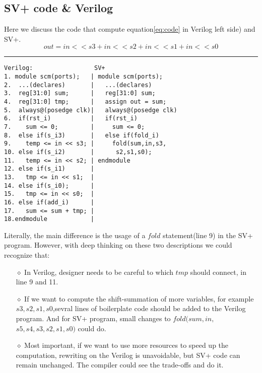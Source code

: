\documentclass{acm_proc_article-sp}
\begin{document}
\subsection{SV+ code \& Verilog}
Here we discuss the code that compute equation\eqref{eq:code} in Verilog left side) and SV+.
\begin{equation}
out = in{<<}s3{+}in{<<}s2{+}in{<<}s1{+}in{<<}s0 
\label{eq:code}
\end{equation}
\hrule
\vspace{-3ex}
\begin{verbatim}
Verilog:                 SV+
1. module scm(ports);   | module scm(ports);
2.  ...(declares)       |   ...(declares)
3.  reg[31:0] sum;      |   reg[31:0] sum;
4.  reg[31:0] tmp;      |   assign out = sum;
5.  always@(posedge clk)|   always@(posedge clk)
6.  if(rst_i)           |   if(rst_i)
7.    sum <= 0;         |     sum <= 0;
8.  else if(s_i3)       |   else if(fold_i)
9.    temp <= in << s3; |     fold(sum,in,s3,
10. else if(s_i2)       |      s2,s1,s0);
11.   temp <= in << s2; | endmodule
12. else if(s_i1)       | 
13.   tmp <= in << s1;  | 
14. else if(s_i0);      | 
15.   tmp <= in << s0;  |
16. else if(add_i)      |
17.   sum <= sum + tmp; |
18.endmodule            | 
\end{verbatim}
\vspace{-3ex}
Literally, the main difference  is the usage of a $fold$ statement(line 9) in the SV+ 
program. However, with deep thinking on these two descriptions we could recognize that:
\vspace{-3ex}
\begin{itemize}\itemsep2pt \parskip0pt 
\item[$\diamond$] In Verilog, designer needs to be careful to which $tmp$ should connect, in line 9 and 11.
\item[$\diamond$] If we want to compute the shift-summation of more variables, for example $s3,s2,s1,s0$,sevral 
lines of boilerplate code should be added to the Verilog program. And for SV+ program, small 
changes to $fold(sum,in,$ $s5,s4,s3,s2,s1,s0)$ could do.
\item[$\diamond$] Most important, if we want to use more resources to speed up the computation, rewriting on 
the 
Verilog is unavoidable, but SV+ code can remain unchanged. The compiler could see the 
trade-offs and do it. 
\end{itemize}
\end{document}
